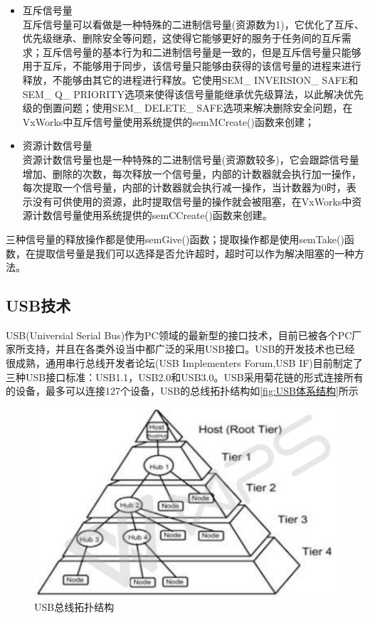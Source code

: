 \begin{itemize}
\item 互斥信号量\\
	互斥信号量可以看做是一种特殊的二进制信号量(资源数为1)，它优化了互斥、优先级继承、删除安全等问题，这使得它能够更好的服务于任务间的互斥需求；互斥信号量的基本行为和二进制信号量是一致的，但是互斥信号量只能够用于互斥，不能够用于同步，该信号量只能够由获得的该信号量的进程来进行释放，不能够由其它的进程进行释放。它使用SEM\_ INVERSION\_ SAFE和SEM\_ Q\_ PRIORITY选项来使得该信号量能继承优先级算法，以此解决优先级的倒置问题；使用SEM\_ DELETE\_ SAFE选项来解决删除安全问题，在VxWorks中互斥信号量使用系统提供的semMCreate()函数来创建；
	
\item 资源计数信号量\\
	资源计数信号量也是一种特殊的二进制信号量(资源数较多)，它会跟踪信号量增加、删除的次数，每次释放一个信号量，内部的计数器就会执行加一操作，每次提取一个信号量，内部的计数器就会执行减一操作，当计数器为0时，表示没有可供使用的资源，此时提取信号量的操作就会被阻塞，在VxWorks中资源计数信号量使用系统提供的semCCreate()函数来创建。

\end{itemize}
	
三种信号量的释放操作都是使用semGive()函数；提取操作都是使用semTake()函数，在提取信号量是我们可以选择是否允许超时，超时可以作为解决阻塞的一种方法。




\subsection{USB技术}
	USB(Universial Serial Bus)作为PC领域的最新型的接口技术，目前已被各个PC厂家所支持，并且在各类外设当中都广泛的采用USB接口。USB的开发技术也已经很成熟，通用串行总线开发者论坛(USB Implementers Forum,USB IF)目前制定了三种USB接口标准：USB1.1，USB2.0和USB3.0。USB采用菊花链的形式连接所有的设备，最多可以连接127个设备，USB的总线拓扑结构如\autoref{fig:USB体系结构}所示
\begin{figure}[!h]
\centering
\includegraphics[width=1.0\textwidth]{./graphics/usb-structure.pdf}
\caption{USB总线拓扑结构}\label{fig:USB体系结构}
\end{figure}


